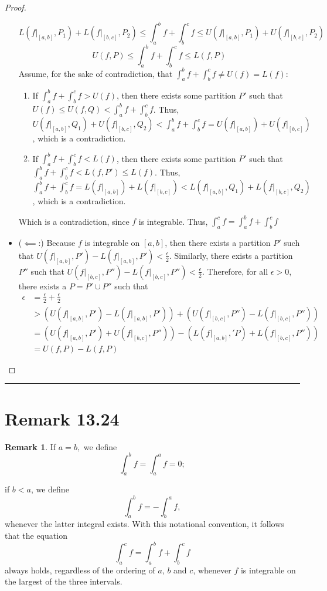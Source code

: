 \documentclass[openany, amssymb, psamsfonts]{amsart}
\theoremstyle{definition}
\newtheorem{rem}{Remark}[section]
\numberwithin{equation}{section}
\begin{document}
\begin{proof}
\begin{itemize}
        \[L(f|_{[a,b]}, P_1) + L(f|_{[b,c]}, P_2)\leq \int_a^bf + \int_b^cf \leq U(f|_{[a,b]}, P_1) + U(f|_{[b,c]}, P_2)\]
        \[U(f, P) \leq \int_a^bf + \int_b^cf \leq L(f,P)\]
        Assume, for the sake of contradiction, that $\int_a^bf + \int_b^cf \neq U(f) = L(f):$
        \begin{enumerate}
            \item If $\int_a^bf + \int_b^cf> U(f)$, then there exists some partition $P'$ such that $U(f) \leq U(f,Q)< \int_a^bf + \int_b^cf$. Thus, $U(f|_{[a,b]}, Q_1) + U(f|_{[b,c]}, Q_2)< \int_a^bf + \int_b^cf = U(f|_{[a,b]}) + U(f|_{[b,c]})$, which is a contradiction. 
            \item If $\int_a^bf + \int_b^cf< L(f)$, then there exists some partition $P'$ such that $\int_a^bf + \int_b^cf< L(f,P')\leq L(f)$. Thus, $\int_a^bf + \int_b^cf = L(f|_{[a,b]}) + L(f|_{[b,c]})< L(f|_{[a,b]}, Q_1) + L(f|_{[b,c]}, Q_2)$, which is a contradiction. 
        \end{enumerate}
        Which is a contradiction, since $f$ is integrable. Thus, $\int_a^cf = \int_a^bf + \int_b^cf$
        \item ($\impliedby$:) Because $f$ is integrable on $[a,b]$, then there exists a partition $P'$ such that $U(f|_{[a,b]},P') - L(f|_{[a,b]},P')< \frac{\epsilon}{2}$. Similarly, there exists a partition $P''$ such that $U(f|_{[b,c]},P'') - L(f|_{[b,c]},P'')< \frac{\epsilon}{2}$. Therefore, for all $\epsilon>0$, there exists a $P = P' \cup P''$ such that 
        \begin{align*}
            \epsilon &= \frac{\epsilon}{2} + \frac{\epsilon}{2}\\
                     &>(U(f|_{[a,b]},P') - L(f|_{[a,b]},P')) + (U(f|_{[b,c]},P'') - L(f|_{[b,c]},P''))\\
                     &= (U(f|_{[a,b]},P') + U(f|_{[b,c]},P'')) - (L(f|_{[a,b]},'P) + L(f|_{[b,c]},P''))\\
\tag{Lemma 13.22.5}                     &= U(f, P) - L(f,P)
        \end{align*}
    \end{itemize}
\end{proof}\vspace{4pt}     \hrule   \vspace{4pt} 

\section*{Remark 13.24}
\begin{rem}
\label{13.24}
If $a=b,$ we define
\[ \int_a^b f=\int_a^a f = 0;
\]
 
 if $b < a$, we define
\[
	\int_{a}^{b} f = - \int_{b}^{a} f, 
\]
whenever the latter integral exists. With this notational convention, it follows that the equation
\[
\int_{a}^{c} f = \int_{a}^{b} f + \int_{b}^{c}f
\]
always holds, regardless of the ordering of $a$, $b$ and $c$, whenever $f$ is integrable on the largest of the three intervals.
\end{rem}
\end{document}
